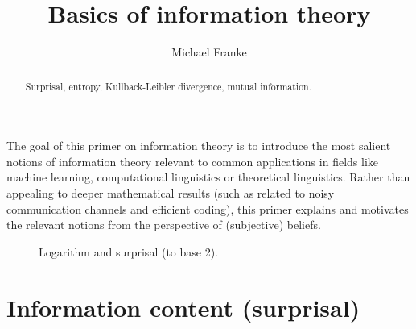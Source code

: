 \documentclass[nobib,nofonts]{tufte-handout}
\title{Basics of information theory}
\author[M.~Franke]{Michael Franke}
\date{} %
\begin{document}
\maketitle

\begin{abstract}
\noindent
Surprisal, entropy, Kullback-Leibler divergence, mutual information.
\end{abstract}

The goal of this primer on information theory is to introduce the most salient notions of information theory relevant to common applications in fields like machine learning, computational linguistics or theoretical linguistics.
Rather than appealing to deeper mathematical results (such as related to noisy communication channels and efficient coding), this primer explains and motivates the relevant notions from the perspective of (subjective) beliefs.

\begin{figure}
  \centering
\hfill
{}

\caption{Logarithm and surprisal (to base 2).}
\label{fig:log-surprisal}
\end{figure}

\section{Information content (surprisal)}
\end{document}
